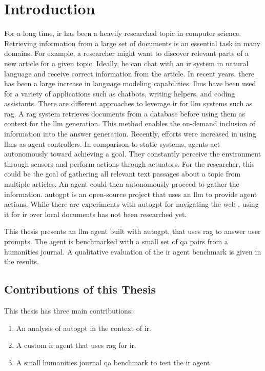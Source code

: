 \documentclass[../main.tex]{subfiles}
\begin{document}
\chapter{Introduction}
\label{ch:introduction}

For a long time, \gls{ir} has been a heavily researched topic in computer science.
Retrieving information from a large set of documents is an essential task in many domains.
For example,
a researcher might want to discover relevant parts of a new article for a given topic.
Ideally, he can chat with an \gls{ir} system in natural language
and receive correct information from the article.
In recent years, there has been a large increase in language modeling capabilities.
\Glspl{llm} have been used for a variety of applications such as chatbots,
writing helpers, and coding assistants.
There are different approaches to leverage \gls{ir} for \gls{llm} systems such as \gls{rag}.
A \Gls{rag} system retrieves documents from a database before using them as context
for the \gls{llm} generation.
This method enables the on-demand inclusion of information into the answer generation.
Recently, efforts were increased in using \glspl{llm} as agent controllers.
In comparison to static systems, agents act autonomously toward achieving a goal.
They constantly perceive the environment through sensors and perform actions
through actuators.
For the researcher,
this could be the goal of gathering all relevant text passages about a topic from
multiple articles.
An agent could then autonomously proceed to gather the information.
\Gls{autogpt} is an open-source project that uses an \gls{llm} to provide agent
actions.
While there are experiments with \gls{autogpt} for navigating the web \cite{Yang2023},
using it for \gls{ir} over local documents has not been researched yet.

This thesis presents an \gls{llm} agent built with \gls{autogpt},
that uses \gls{rag} to answer user prompts.
The agent is benchmarked with a small set of \gls{qa} pairs from a humanities journal.
A qualitative evaluation of the \gls{ir} agent benchmark is given in the results.

\section{Contributions of this Thesis}

This thesis has three main contributions:
\begin{enumerate}
    \item An analysis of \gls{autogpt} in the context of \gls{ir}.
    \item A custom \gls{ir} agent that uses \gls{rag} for \gls{ir}.
    \item A small humanities journal \gls{qa} benchmark to test the \gls{ir} agent.
\end{enumerate}
\end{document}
